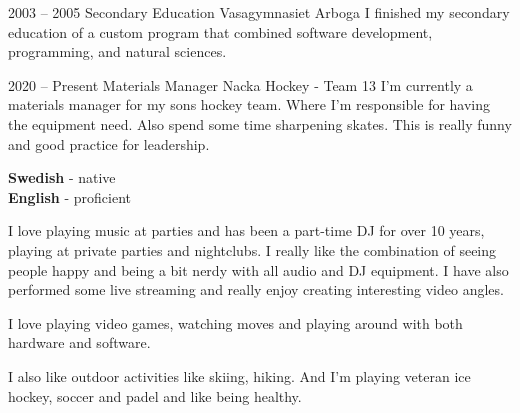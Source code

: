\documentclass[9pt]{developercv} %
\begin{document}
\pagebreak



\begin{entrylist}
  \entry
    {2003 -- 2005}
    {Secondary Education}
    {Vasagymnasiet Arboga}
    {I finished my secondary education of a custom program that combined
      software development, programming, and natural sciences.}
\end{entrylist}



\begin{entrylist}
  \entry
    {2020 -- Present}
    {Materials Manager}
    {Nacka Hockey - Team 13}
    {I'm currently a materials manager for my sons hockey team. Where I'm
      responsible for having the equipment need. Also spend some time sharpening
      skates. This is really funny and good practice for leadership.}
\end{entrylist}


\begin{minipage}[t]{0.3\textwidth}
  \vspace{-\baselineskip} %


  \textbf{Swedish} - native\\
  \textbf{English} - proficient
\end{minipage}
\hfill
\begin{minipage}[t]{0.7\textwidth}
  \vspace{-\baselineskip} %


  I love playing music at parties and has been a part-time DJ for over 10 years,
  playing at private parties and nightclubs. I really like the combination of seeing
  people happy and being a bit nerdy with all audio and DJ equipment. I have also
  performed some live streaming and really enjoy creating interesting video angles.

  I love playing video games, watching moves and playing around with both hardware
  and software.

  I also like outdoor activities like skiing, hiking. And I'm playing veteran
  ice hockey, soccer and padel and like being healthy.
\end{minipage}
\end{document}
